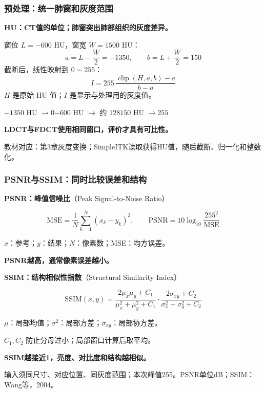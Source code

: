 \documentclass[11pt,aspectratio=169]{beamer}
\newcommand{\key}[1]{{\color{Accent}\bfseries #1}}
\newcommand{\source}[1]{\vfill{\fontsize{7.5}{9}\selectfont\color{Muted}#1\par}}
\begin{document}
\begin{frame}
\frametitle{预处理：统一肺窗和灰度范围}
\textbf{HU：CT值的单位；肺窗突出肺部组织的灰度差异。}\par
\vspace{2mm}
窗位 $L=-600$ HU，窗宽 $W=1500$ HU：
\[
 a=L-\frac{W}{2}=-1350,\qquad b=L+\frac{W}{2}=150
\]
截断后，线性映射到 $0\sim255$：
\[
 I=255\,\frac{\operatorname{clip}(H,a,b)-a}{b-a}
\]
{\small $H$ 是原始 HU 值；$I$ 是显示与处理用的灰度值。}\par
\vspace{3mm}
$-1350$ HU $\rightarrow 0$\qquad $-600$ HU $\rightarrow$ 约 $128$\qquad $150$ HU $\rightarrow255$\par
\vspace{3mm}
\key{LDCT与FDCT使用相同窗口，评价才具有可比性。}
\source{教材对应：第3章灰度变换；SimpleITK读取获得HU值，随后截断、归一化和整数化。}
\end{frame}

\begin{frame}
\frametitle{PSNR与SSIM：同时比较误差和结构}
{\small\textbf{PSNR：峰值信噪比}（Peak Signal-to-Noise Ratio）\par}
\[
 \mathrm{MSE}=\frac1N\sum_{k=1}^{N}(x_k-y_k)^2,\qquad
 \mathrm{PSNR}=10\log_{10}\frac{255^2}{\mathrm{MSE}}
\]
{\small $x$：参考；$y$：结果；$N$：像素数；MSE：均方误差。\par
\key{PSNR越高，通常像素误差越小。}}\par
\vspace{1mm}
{\small\textbf{SSIM：结构相似性指数}（Structural Similarity Index）\par}
\[
 \mathrm{SSIM}(x,y)=
 \frac{2\mu_x\mu_y+C_1}{\mu_x^2+\mu_y^2+C_1}
 \cdot
 \frac{2\sigma_{xy}+C_2}{\sigma_x^2+\sigma_y^2+C_2}
\]
{\small $\mu$：局部均值；$\sigma^2$：局部方差；$\sigma_{xy}$：局部协方差。\par
$C_1,C_2$ 防止分母过小；局部窗口计算后取平均。\par
\key{SSIM越接近1，亮度、对比度和结构越相似。}}\par
\source{输入须同尺寸、对应位置、同灰度范围；本次峰值255。PSNR单位dB；SSIM：Wang等，2004。}
\end{frame}
\end{document}
